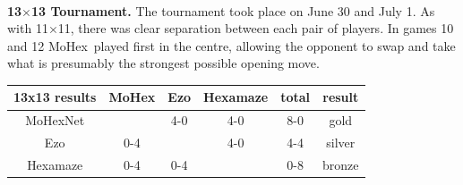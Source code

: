 \documentclass{icga}
\def\Eo{\mbox{\sc Ezo}}
\def\Hz{\mbox{\sc Hexamaze}}
\def\Mx{\mbox{\sc MoHex}}
\def\Mt{\mbox{\sc MoHexNet}}
\begin{document}
~

{\large\bf 13$\times$13 Tournament.}
The tournament took place on June 30 and July 1.
As with 11$\times$11, there was clear separation
between each pair of players.
In games 10 and 12 \Mx\ played first in the centre,
allowing the opponent to swap and take what is presumably
the strongest possible opening move.

\hfill\begin{tabular}{|c|c|c|c|c|c|}
\hline 13x13 results &\Mx{} &\Eo{}  &\Hz{} & total & result \\ 
\hline \Mt{}         &      &  4-0  & 4-0  & 8-0   & gold \\
\hline \Eo{}         &  0-4 &       & 4-0  & 4-4   & silver \\
\hline \Hz{}         &  0-4 &  0-4  &      & 0-8   & bronze \\
\hline
\end{tabular}\hfill~

%
%
%
%
%
%
%
%
%
%
%
\end{document}
